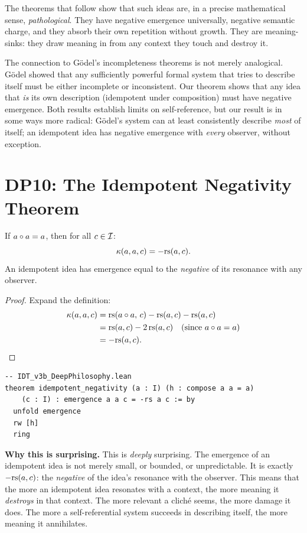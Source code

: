 The theorems that follow show that such ideas are, in a precise
mathematical sense, \emph{pathological}. They have negative emergence
universally, negative semantic charge, and they absorb their own
repetition without growth. They are meaning-sinks: they draw meaning
in from any context they touch and destroy it.

The connection to G\"odel's incompleteness theorems is not merely
analogical. G\"odel showed that any sufficiently powerful formal system
that tries to describe itself must be either incomplete or inconsistent.
Our theorem shows that any idea that \emph{is} its own description
(idempotent under composition) must have negative emergence. Both
results establish limits on self-reference, but our result is in some
ways more radical: G\"odel's system can at least consistently describe
\emph{most} of itself; an idempotent idea has negative emergence with
\emph{every} observer, without exception.

\section{DP10: The Idempotent Negativity Theorem}

\begin{theorem}
\label{thm:idempotent-negativity}
If $a \circ a = a$, then for all $c \in \mathcal{I}$:
\[
\kappa(a, a, c) = -\mathrm{rs}(a, c).
\]
An idempotent idea has emergence equal to the \emph{negative} of its
resonance with any observer.
\end{theorem}

\begin{proof}
Expand the definition:
\begin{align*}
\kappa(a, a, c) &= \mathrm{rs}(a \circ a,\, c) - \mathrm{rs}(a, c) - \mathrm{rs}(a, c) \\
&= \mathrm{rs}(a, c) - 2\,\mathrm{rs}(a, c)
\quad\text{(since $a \circ a = a$)} \\
&= -\mathrm{rs}(a, c). \qedhere
\end{align*}
\end{proof}

\begin{lstlisting}
-- IDT_v3b_DeepPhilosophy.lean
theorem idempotent_negativity (a : I) (h : compose a a = a)
    (c : I) : emergence a a c = -rs a c := by
  unfold emergence
  rw [h]
  ring
\end{lstlisting}

\begin{surprisebox}
\textbf{Why this is surprising.} This is \emph{deeply} surprising. The
emergence of an idempotent idea is not merely small, or bounded, or
unpredictable. It is exactly $-\mathrm{rs}(a, c)$: the \emph{negative} of the
idea's resonance with the observer. This means that the more an
idempotent idea resonates with a context, the more meaning it
\emph{destroys} in that context. The more relevant a clich\'e seems,
the more damage it does. The more a self-referential system succeeds
in describing itself, the more meaning it annihilates.
\end{surprisebox}

